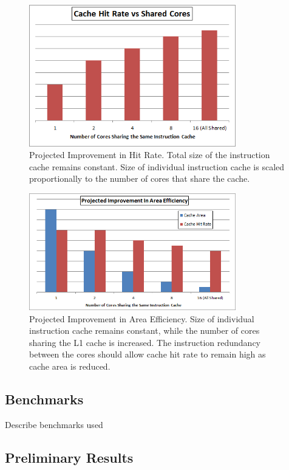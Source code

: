 
\begin{figure}[ht!]
\centering
\includegraphics[width=90mm]{HitRateImprov.png}
\caption{Projected Improvement in Hit Rate. Total size of the instruction cache remains constant. Size of individual instruction cache is scaled proportionally to the number of cores that share the cache.}
\label{HitImprov}
\end{figure}

\begin{figure}[ht!]
\centering
\includegraphics[width=90mm]{AreaEff.png}
\caption{Projected Improvement in Area Efficiency. Size of individual instruction cache remains constant, while the number of cores sharing the L1 cache is increased. The instruction redundancy between the cores should allow cache hit rate to remain high as cache area is reduced. }
\label{AreaEff}
\end{figure}

\subsection{Benchmarks}
Describe benchmarks used 

\subsection{Preliminary Results}

